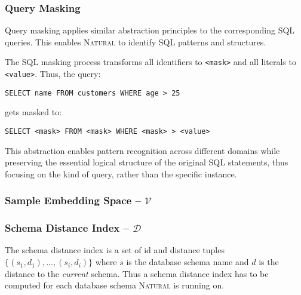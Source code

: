 \subsubsection{Query Masking}

Query masking applies similar abstraction principles to the corresponding SQL queries.
This enables \textsc{Natural} to identify SQL patterns and structures.

The SQL masking process transforms all identifiers to \texttt{<mask>} and all
literals to \texttt{<value>}. Thus, the query:

\begin{verbatim}
SELECT name FROM customers WHERE age > 25
\end{verbatim}

gets masked to:

\begin{verbatim}
SELECT <mask> FROM <mask> WHERE <mask> > <value>
\end{verbatim}

This abstraction enables pattern recognition across different domains while
preserving the essential logical structure of the original SQL statements,
thus focusing on the kind of query, rather than the specific instance.

\subsubsection{Sample Embedding Space – $\mathcal{V}$}


\subsubsection{Schema Distance Index – $\mathcal{D}$}

The schema distance index is a set of id and distance tuples $\{(s_1, d_1), ..., (s_i,d_i)\}$
where $s$ is the database schema name and $d$ is the distance to the
\textit{current} schema. Thus a schema distance index has to be computed for each database schema
\textsc{Natural} is running on.




























